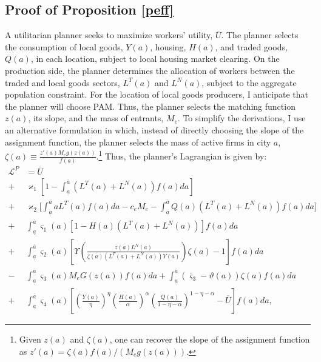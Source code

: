 \subsection{Proof of Proposition \ref{peff}}\label{a:spprob}
A utilitarian planner seeks to maximize workers' utility, $\overline{U}$. The planner selects the consumption of local goods, $Y(a)$, housing, $H(a)$, and traded goods, $Q(a)$, in each location, subject to local housing market clearing. On the production side, the planner determines the allocation of workers between the traded and local goods sectors, $L^{T}(a)$ and $L^{N}(a)$, subject to the aggregate population constraint. For the location of local goods producers, I anticipate that the planner will choose PAM. Thus, the planner selects the matching function $z(a)$, its slope, and the mass of entrants, $M_e$. To simplify the derivations, I use an alternative formulation in which, instead of directly choosing the slope of the assignment function, the planner selects the mass of active firms in city $a$, $\zeta(a) \equiv \frac{z'(a) M_e g(z(a))}{f(a)}$.\footnote{Given $z(a)$ and $\zeta(a)$, one can recover the slope of the assignment function as $z'(a) = \zeta(a) f(a)/(M_e g(z(a)))$.} Thus, the planner's Lagrangian is given by:
\begin{align*}
	\mathcal{L}^P & = \overline{U} \\
					 +  & \varkappa_1 \left[1 - \int_{\underline{a}}^{\overline{a}} \left(L^T(a) + L^{N}(a) \right)f(a) da \right] \\
					 +  & \varkappa_2 \Bigg[\int_{\underline{a}}^{\overline{a}} a L^T(a) f(a) da - c_e M_e  - \int_{\underline{a}}^{\overline{a}} Q(a)\left(L^T(a) + L^{N}(a)\right)f(a) da\Bigg] \\
					 +  & \int_{\underline{a}}^{\overline{a}} \varsigma_1(a) \left[ 1 - H(a) \left(L^T(a) + L^{N}(a)\right) \right]f(a)da \\
					 + & \int_{\underline{a}}^{\overline{a}} \varsigma_2(a) \left[ \Upsilon\left(\frac{z(a) L^{N}(a)}{\zeta(a) \left(L^T(a) + L^{N}(a)\right) Y(a)} \right) \zeta(a) - 1 \right] f(a)da \\
					 - & \int_{\underline{a}}^{\overline{a}} \varsigma_3(a) M_e G(z(a))f(a) da +  \int_{\underline{a}}^{\overline{a}} (\overline{\varsigma}_3 - \vartheta(a)) \zeta(a) f(a) da \\
					 + & \int_{\underline{a}}^{\overline{a}} \varsigma_4(a) \left[\left(\frac{Y(a)}{\eta}\right)^{\eta} \left(\frac{H(a)}{\alpha}\right)^{\alpha}  \left(\frac{Q(a)}{1 - \eta - \alpha}\right)^{1 - \eta - \alpha} - \overline{U}\right] f(a) da,
\end{align*} 

